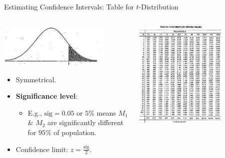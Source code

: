 \begin{frame}{Estimating Confidence Intervals: Table for $t$-Distribution}
	\begin{columns}
		\begin{column}{0.5\textwidth}
			\vspace{-6cm}
			\centering
			\includegraphics[width=0.8\textwidth]{img/ttest1.jpeg}
			\begin{itemize}
				\item Symmetrical.
				\item \textbf{\color{airforceblue}Significance level}:
				      \begin{itemize}
					      \item E.g., $\text{sig} = 0.05$ or $5\%$ means $M_1$ \& $M_2$ are significantly different for $95\%$ of population.
				      \end{itemize}
				\item Confidence limit: $z = \frac{\text{sig}}{2}$.
			\end{itemize}
		\end{column}
		\begin{column}{0.5\textwidth}
			\centering
			\includegraphics[width=0.7\textwidth]{img/ttest2.jpeg}
		\end{column}
	\end{columns}
\end{frame}

